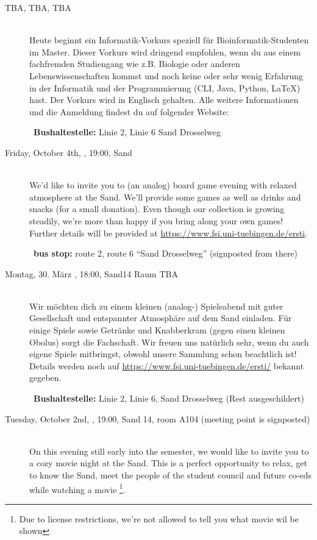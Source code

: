 \begin{description}
\ifwintersemester
    \ifmaster
        \ifbinfo
            \item[TBA, TBA, TBA]\ \\
                Heute beginnt ein Informatik-Vorkurs speziell für Bioinformatik-Studenten im Master. Dieser Vorkurs wird dringend empfohlen, wenn du aus einem fachfremden Studiengang wie z.B. Biologie oder anderen Lebenswissenschaften kommst und noch keine oder sehr wenig Erfahrung in der Informatik und der Programmierung (CLI, Java, Python, \LaTeX) hast. Der Vorkurs wird in Englisch gehalten. Alle weitere Informationen und die Anmeldung findest du auf folgender Website: \\ \url{}

            ~\textbf{Bushaltestelle:} Linie 2, Linie 6 Sand Drosselweg
        \fi
    \fi
\fi

\ifml
	\item[Friday, October 4th, \YEAR, 19:00, Sand]\ \\
	We'd like to invite you to (an analog) board game evening with relaxed atmosphere at the Sand. We'll provide some games as well as drinks and snacks (for a small donation). Even though our collection is growing steadily, we're more than happy if you bring along your own games! Further details will be provided at \url{https://www.fsi.uni-tuebingen.de/ersti}.

	~\textbf{bus stop:} route 2, route 6 "`Sand Drosselweg"' (signposted from there)
\else
	\item[Montag, 30. März \YEAR, 18:00, Sand14 Raum TBA]\ \\
	Wir möchten dich zu einem kleinen (analog-) Spieleabend mit guter Gesellschaft und entspannter Atmosphäre auf dem Sand einladen. Für einige Spiele sowie Getränke und Knabberkram (gegen einen kleinen Obolus) sorgt die Fachschaft. Wir freuen uns natürlich sehr, wenn du auch eigene Spiele mitbringst, obwohl unsere Sammlung schon beachtlich ist! Details werden noch auf \url{https://www.fsi.uni-tuebingen.de/ersti/} bekannt gegeben.

	~\textbf{Bushaltestelle:} Linie 2, Linie 6, Sand Drosselweg (Rest ausgeschildert)
\fi

\ifml
	\item[Tuesday, October 2nd, \YEAR, 19:00, Sand 14, room A104 (meeting point is signposted)]\ \\
	On this evening still early into the semester, we would like to invite you to a cozy movie night at the Sand. This is a perfect opportunity to relax, get to know the Sand, meet the people of the student council and future co-eds while watching a movie \footnote{Due to license restrictions, we're not allowed to tell you what movie wil be shown}.


\end{description}
